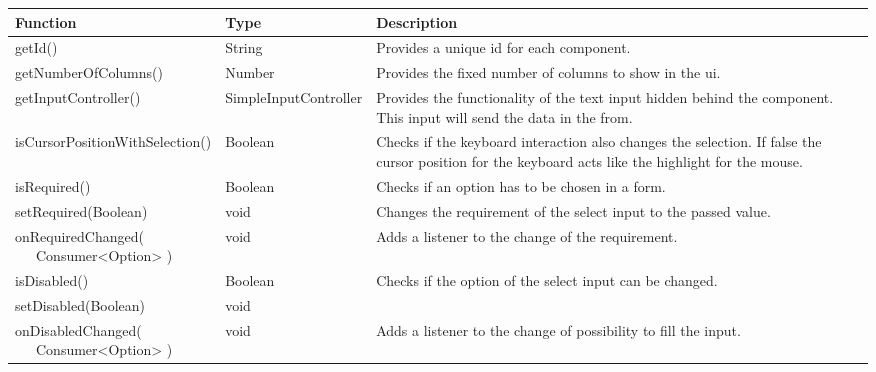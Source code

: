 \begin{table}[!htb] 
    \label{api:selectControllerReturn}
    \footnotesize
    \setlength\extrarowheight{4pt}
    \begin{tabular}{ p{5cm} p{3cm} p{4.5cm} }
        \toprule[1.2pt]
        \textbf{Function}                    & \textbf{Type}          & \textbf{Description} \\
        \midrule
        getId()                              & String                 & Provides a unique id for each component. \\
        getNumberOfColumns()                 & Number                 & Provides the fixed number of columns to show in the ui. \\
        getInputController()                 & SimpleInputController  & Provides the functionality of the text input hidden behind the component. 
                                                                        This input will send the data in the from. \\
        isCursorPositionWithSelection()      & Boolean                & Checks if the keyboard interaction also changes the selection. 
                                                                        If false the cursor position for the keyboard acts like the highlight for the mouse. \\
        isRequired()                         & Boolean                & Checks if an option has to be chosen in a form. \\
        setRequired(Boolean)                 & void                   & Changes the requirement of the select input to the passed value. \\
        \tbbr{
            onRequiredChanged( \\
                \ \ \ Consumer<Option>
            )}                               & void                   & Adds a listener to the change of the requirement. \\
        isDisabled()                         & Boolean                & Checks if the option of the select input can be changed.  \\
        setDisabled(Boolean)                 & void                   &  \\
        \tbbr{
            onDisabledChanged( \\
                \ \ \ Consumer<Option>
            )}                               & void                   & Adds a listener to the change of possibility to fill the input. \\

\end{tabular}
\end{table}
